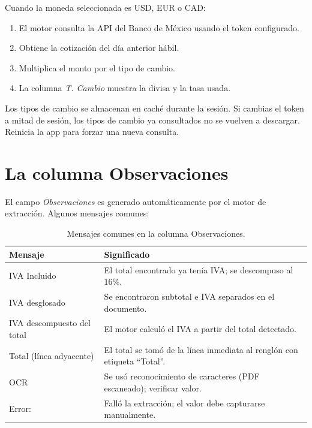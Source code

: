 \documentclass[12pt, a4paper, oneside]{report}
\newcommand{\campo}[1]{\textit{#1}}
\begin{document}
Cuando la moneda seleccionada es USD, EUR o CAD:

\begin{enumerate}
  \item El motor consulta la API del Banco de México usando el token configurado.
  \item Obtiene la cotización del día anterior hábil.
  \item Multiplica el monto por el tipo de cambio.
  \item La columna \campo{T. Cambio} muestra la divisa y la tasa usada.
\end{enumerate}

\begin{consejobox}
Los tipos de cambio se almacenan en caché durante la sesión. Si cambias el
token a mitad de sesión, los tipos de cambio ya consultados no se vuelven a
descargar. Reinicia la app para forzar una nueva consulta.
\end{consejobox}

\section{La columna Observaciones}

El campo \campo{Observaciones} es generado automáticamente por el motor de
extracción. Algunos mensajes comunes:

\begin{table}[H]
  \centering
  \begin{tabularx}{\linewidth}{lX}
    \toprule
    \textbf{Mensaje} & \textbf{Significado} \\
    \midrule
    IVA Incluido             & El total encontrado ya tenía IVA; se descompuso al 16\%. \\
    IVA desglosado           & Se encontraron subtotal e IVA separados en el documento. \\
    IVA descompuesto del total & El motor calculó el IVA a partir del total detectado. \\
    Total (línea adyacente)  & El total se tomó de la línea inmediata al renglón con etiqueta ``Total''. \\
    OCR                    & Se usó reconocimiento de caracteres (PDF escaneado); verificar valor. \\
    Error:                   & Falló la extracción; el valor debe capturarse manualmente. \\
    \bottomrule
  \end{tabularx}
  \caption{Mensajes comunes en la columna Observaciones.}
\end{table}
\end{document}
